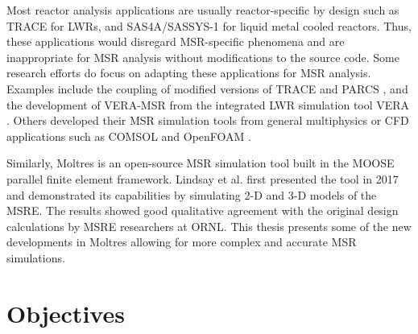 Most reactor analysis applications are usually reactor-specific by
design such as TRACE \cite{nrc_trace_2007} for \glspl{LWR}, and
SAS4A/SASSYS-1 \cite{fanning_sas4a/sassys-1_2017} for
liquid metal cooled reactors. Thus, these applications would disregard
\gls{MSR}-specific phenomena and are inappropriate for \gls{MSR}
analysis without modifications to the source code. Some research efforts
do focus on adapting these applications for \gls{MSR} analysis. Examples
include the coupling of modified versions of TRACE and PARCS
\cite{pettersen_coupled_2016}, and the development of VERA-MSR from the
integrated \gls{LWR} simulation tool VERA \cite{graham_development_2019}.
Others developed their \gls{MSR} simulation tools from general
multiphysics or \gls{CFD} applications such as COMSOL
\cite{fiorina_modelling_2014} and OpenFOAM \cite{aufiero_development_2014}.

Similarly, Moltres \cite{lindsay_introduction_2018} is an open-source MSR
simulation tool built in the \gls{MOOSE} \cite{gaston_physics-based_2015}
parallel finite element framework. Lindsay et al.
\cite{lindsay_introduction_2018} first presented the tool in 2017 and
demonstrated its capabilities by simulating 2-D and 3-D models of the
\gls{MSRE}. The results showed good qualitative
agreement with the original design calculations by \gls{MSRE} researchers at
\gls{ORNL}. This thesis presents some of the new developments in Moltres
allowing for more complex and accurate \gls{MSR} simulations.

\section{Objectives}

